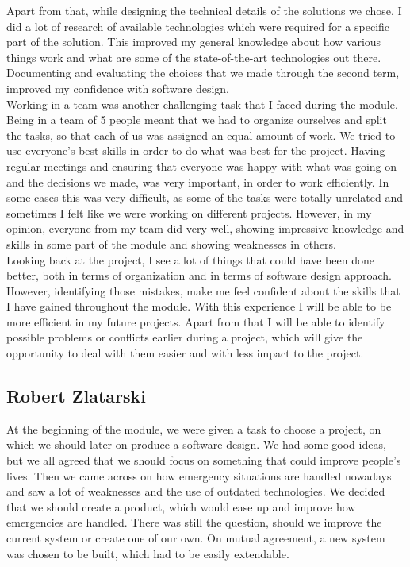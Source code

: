 \documentclass[]{article}
\begin{document}
Apart from that, while designing the technical details of the solutions we chose, I did a lot of research of available technologies which were required for a specific part of the solution. This improved my general knowledge about how various things work and what are some of the state-of-the-art technologies out there. Documenting and evaluating the choices that we made through the second term, improved my confidence with software design.\\

Working in a team was another challenging task that I faced during the module. Being in a team of 5 people meant that we had to organize ourselves and split the tasks, so that each of us was assigned an equal amount of work. We tried to use everyone’s best skills in order to do what was best for the project. Having regular meetings and ensuring that everyone was happy with what was going on and the decisions we made, was very important, in order to work efficiently. In some cases this was very difficult, as some of the tasks were totally unrelated and sometimes I felt like we were working on different projects. However, in my opinion, everyone from my team did very well, showing impressive knowledge and skills in some part of the module and showing weaknesses in others.\\

Looking back at the project, I see a lot of things that could have been done better, both in terms of organization and in terms of software design approach. However, identifying those mistakes, make me feel confident about the skills that I have gained throughout the module. With this experience I will be able to be more efficient in my future projects. Apart from that I will be able to identify possible problems or conflicts earlier during a project, which will give the opportunity to deal with them easier and with less impact to the project.
    \pagebreak
    \subsection{Robert Zlatarski}
    At the beginning of the module, we were given a task to choose a project, on which we should later on produce a software design. We had some good ideas, but we all agreed that we should focus on something that could improve people’s lives. Then we came across on how emergency situations are handled nowadays and saw a lot of weaknesses and the use of outdated technologies. We decided that we should create a product, which would ease up and improve how emergencies are handled. There was still the question, should we improve the current system or create one of our own. On mutual agreement, a new system was chosen to be built, which had to be easily extendable.\\
\end{document}
